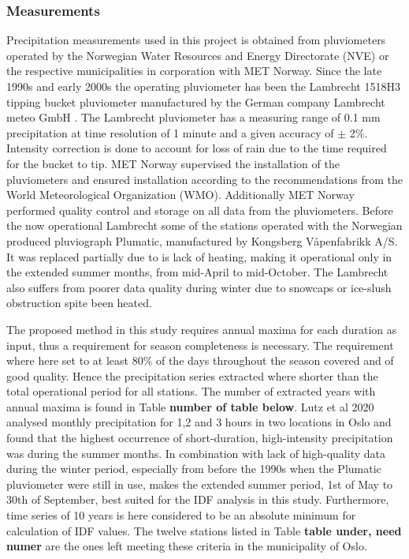 \subsubsection{Measurements}
Precipitation measurements used in this project is obtained from pluviometers operated by the Norwegian Water Resources and Energy Directorate (NVE) or the respective municipalities in corporation with  MET Norway. Since the late 1990s and early 2000s the operating pluviometer has been the Lambrecht 1518H3 tipping bucket pluviometer manufactured by the German company Lambrecht meteo GmbH \cite{lutz_idf}. The Lambrecht pluviometer has a measuring range of 0.1 mm precipitation at time resolution of 1 minute and a given accuracy of $\pm$ 2$\%$. Intensity correction is done to account for loss of rain due to the time required for the bucket to tip. MET Norway supervised the installation of the pluviometers and ensured installation according to the recommendations from the World Meteorological Organization (WMO). Additionally MET Norway performed quality control and storage on all data from the pluviometers. Before the now operational Lambrecht some of the stations operated with the Norwegian produced pluviograph Plumatic, manufactured by Kongsberg Våpenfabrikk A/S. It was replaced partially due to is lack of heating, making it operational only in the extended summer months, from mid-April to mid-October. The Lambrecht also suffers from poorer data quality during winter due to snowcaps or ice-slush obstruction spite been heated.  

The proposed method in this study requires annual maxima for each duration as input, thus a requirement for season completeness is necessary. The requirement where here set to at least 80\% of the days throughout the season covered and of good quality. Hence the precipitation series extracted where shorter than the total operational period for all stations. The number of extracted years with annual maxima is found in Table \textbf{number of table below}. Lutz et al 2020 analysed monthly precipitation for 1,2 and 3 hours in two locations in Oslo and found that the highest occurrence of short-duration, high-intensity precipitation was during the summer months. In combination with lack of high-quality data during the winter period, especially from before the 1990s when the Plumatic pluviometer were still in use, makes the extended summer period, 1st of May to 30th of September, best suited for the IDF analysis in this study. Furthermore, time series of 10 years is here considered to be an absolute minimum for calculation of IDF values. The twelve stations listed in Table \textbf{table under, need numer} are the ones left meeting these criteria in the municipality of Oslo.   

